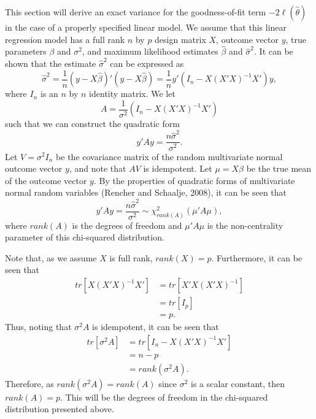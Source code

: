 This section will derive an exact variance for the goodness-of-fit term $-2 \ell (\hat{\theta} )$ in the case of a properly specified
linear model. We assume that this linear regression model has a full rank $n$ by $p$ design matrix $X$, outcome vector $y$, true parameters $\beta$ and $\sigma^2$,
and maximum likelihood estimates $\hat{\beta}$ and $\hat{\sigma}^2$. It can be shown that the estimate $\hat{\sigma}^2$ can be expressed as
\begin{equation*}
	\hat{\sigma}^2 =  \frac{1}{n} (y-X\hat{\beta})'(y-X\hat{\beta}) = \frac{1}{n} y'(I_n - X(X'X)^{-1}X')y ,
\end{equation*}
where $I_n$ is an $n$ by $n$ identity matrix. We let
\begin{equation*}
	A = \frac{1}{\sigma^2} (I_n - X(X'X)^{-1}X') 
\end{equation*}
such that we can construct the quadratic form
\begin{equation*}
	y'Ay = \frac{n \hat{\sigma}^2}{\sigma^2} .
\end{equation*}
Let $V = \sigma^2 I_n$ be the covariance matrix of the random multivariate normal outcome vector $y$, and note that $AV$ is idempotent. Let $\mu = X \beta$ be the
true mean of the outcome vector $y$. By the properties of quadratic forms of multivariate normal random variables (Rencher and Schaalje, 2008), it can be seen that
\begin{equation*}
	y'Ay = \frac{n \hat{\sigma}^2}{\sigma^2} \sim \chi^2_{rank \left( A \right) } (\mu 'A\mu) ,
\end{equation*}
where $rank \left( A \right)$ is the degrees of freedom and $\mu 'A \mu$ is the non-centrality parameter of this chi-squared distribution.

Note that, as we assume $X$ is full rank, $rank(X) = p$. Furthermore, it can be seen that
\begin{equation*}
	\begin{split}
	tr\left[ X(X'X)^{-1}X' \right] & = tr \left[ X'X(X'X)^{-1} \right]  \\ 
	& = tr \left[ I_p \right] \\
	& = p .
	\end{split}
\end{equation*}
Thus, noting that $\sigma^2 A$ is idempotent, it can be seen that
\begin{equation*}
	\begin{split}
	tr \left[ \sigma^2 A \right] & = tr \left[ I_n - X(X'X)^{-1}X' \right]  \\ 
	& = n-p \\
	& = rank \left( \sigma^2 A \right) .
	\end{split}
\end{equation*}
Therefore, as $rank \left( \sigma^2 A \right) = rank \left( A \right)$ since $\sigma^2$ is a scalar constant, then $rank \left( A \right) = p$. This will be the degrees of
freedom in the chi-squared distribution presented above.

